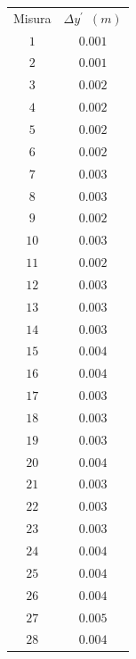\documentclass[12pt, a4paper]{article}
\begin{document}
\begin{longtable}{|c|c|}
    \hline
    \multirow{2}{*}{\small Misura} &
    \multirow{2}{*}{ \small$\Delta y^{'}$\ $(m)$} 
    \\&\\
\hline
\hline
\footnotesize$1$  & \footnotesize$0.001 $ \\
\footnotesize$2$  & \footnotesize$0.001$ \\
\footnotesize$3$  & \footnotesize$0.002 $ \\
\footnotesize$4$  & \footnotesize$0.002 $ \\
\footnotesize$5$  & \footnotesize$0.002 $ \\
\footnotesize$6$  & \footnotesize$0.002 $ \\ 
\footnotesize$7$  & \footnotesize$0.003 $ \\
\footnotesize$8$  & \footnotesize$0.003 $ \\
\footnotesize$9$  & \footnotesize$0.002 $ \\
\footnotesize$10$ & \footnotesize$0.003 $ \\ 
\footnotesize$11$ & \footnotesize$0.002 $ \\
\hline
\footnotesize$12$ & \footnotesize$0.003 $ \\    
\footnotesize$13$ & \footnotesize$0.003 $ \\
\footnotesize$14$ & \footnotesize$0.003 $ \\
\footnotesize$15$ & \footnotesize$0.004 $ \\
\footnotesize$16$ & \footnotesize$0.004 $ \\
\footnotesize$17$ & \footnotesize$0.003 $ \\
\footnotesize$18$ & \footnotesize$0.003 $ \\
\footnotesize$19$ & \footnotesize$0.003 $ \\
\footnotesize$20$ & \footnotesize$0.004 $ \\ 
\footnotesize$21$ & \footnotesize$0.003 $ \\
\footnotesize$22$ & \footnotesize$0.003 $ \\
\footnotesize$23$ & \footnotesize$0.003 $ \\
\footnotesize$24$ & \footnotesize$0.004 $ \\
\footnotesize$25$ & \footnotesize$0.004 $ \\ 
\footnotesize$26$ & \footnotesize$0.004 $ \\
\footnotesize$27$ & \footnotesize$0.005 $ \\
\footnotesize$28$ & \footnotesize$0.004 $ \\

\end{longtable}
\end{document}
